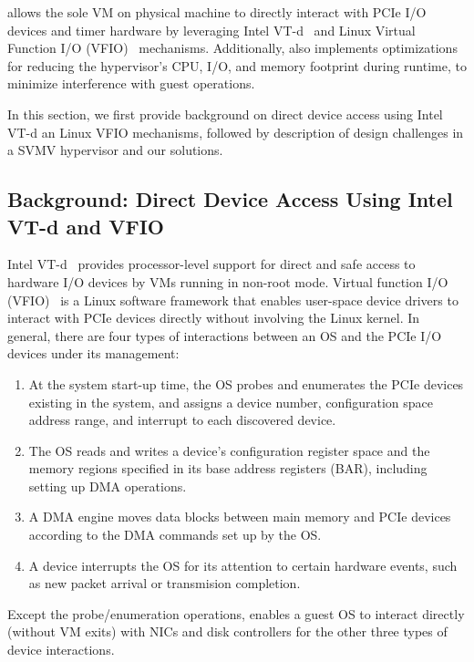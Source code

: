 \na allows the sole VM on physical machine to directly interact with PCIe I/O devices and 
timer hardware by leveraging Intel VT-d~\cite{intelvtd-paper} and 
Linux Virtual Function I/O (VFIO)~\cite{vfio} mechanisms. 
Additionally, \na also implements optimizations for reducing the hypervisor's CPU, I/O, and memory 
footprint during runtime, to minimize interference with guest operations.

In this section, we first  provide background on direct device access using 
Intel VT-d an Linux VFIO mechanisms, followed by description of design challenges 
in a SVMV hypervisor and our solutions.

\subsection{Background: Direct Device Access Using Intel VT-d and VFIO}
Intel VT-d~\cite{intelvtd-paper} provides processor-level support for direct 
and safe access to hardware I/O devices by VMs running in non-root mode.
Virtual function I/O (VFIO)~\cite{vfio} is a Linux software framework that enables user-space
device drivers to interact with PCIe devices directly without involving the Linux kernel. 
In general, there are four types of interactions between an OS and the PCIe 
I/O devices under its management:
\begin{enumerate} 
\parskip 0mm
\itemsep 0mm
\item At the system start-up time, the OS probes and enumerates the PCIe devices existing in the system, and assigns a device number, configuration space address range, and interrupt to each discovered device.

\item The OS reads and writes a device's configuration register space and the memory regions specified in its base address registers (BAR), including setting up DMA operations.

\item A DMA engine moves data blocks between main memory and PCIe devices according to the DMA commands set up by the OS.

\item A device interrupts the OS for its attention to certain hardware events, such as new packet arrival or transmision completion.

\end{enumerate}   
Except the probe/enumeration operations, 
\na enables a guest OS to interact directly (without VM exits) with NICs and disk controllers
for the other three types of device interactions. 

